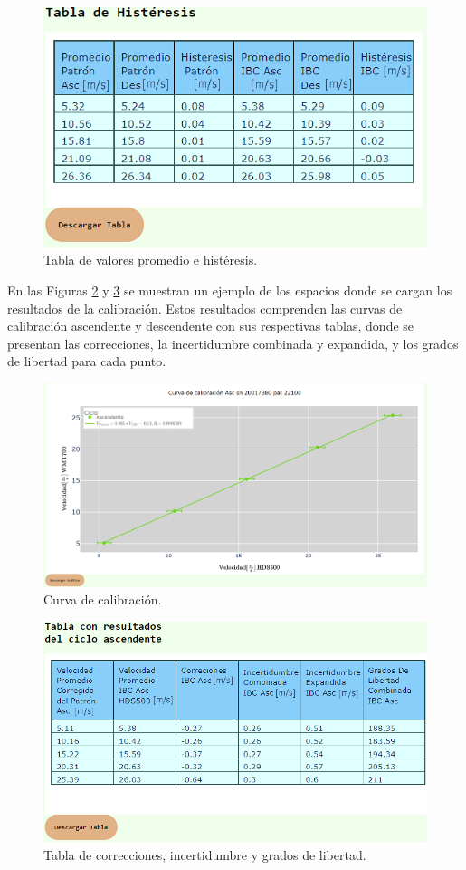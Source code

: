 \begin{figure}[H]
    \centering
    \includegraphics[width=0.55\linewidth]{Figuras/AplicacionWeb/frontend/tablaHisteresis.png}
    \caption{Tabla de valores promedio e histéresis.}
    \label{fig:tablaHisteresis}
\end{figure}

En las Figuras \ref{fig:curvaCalib} y \ref{fig:tablaCalib} se muestran un ejemplo de los espacios donde se cargan los resultados de la calibración. Estos resultados comprenden las curvas de calibración ascendente y descendente con sus respectivas tablas, donde se presentan las correcciones, la incertidumbre combinada y expandida, y los grados de libertad para cada punto.

\begin{figure}[H]
    \centering
    \includegraphics[width=1\linewidth]{Figuras/AplicacionWeb/frontend/curvaCalib.png}
    \caption{Curva de calibración.}
    \label{fig:curvaCalib}
\end{figure}

\begin{figure}[H]
    \centering
    \includegraphics[width=0.7\linewidth]{Figuras/AplicacionWeb/frontend/tablaCalib.png}
    \caption{Tabla de correcciones, incertidumbre y grados de libertad.}
    \label{fig:tablaCalib}
\end{figure}

